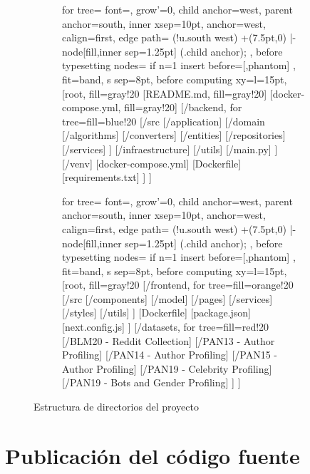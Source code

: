 \bigskip
\begin{figure}[H]
	\centering
	\begin{subfigure}[T]{0.5\textwidth}
		\begin{forest}
			for tree={
			font=\ttfamily\tiny,
			grow'=0,
			child anchor=west,
			parent anchor=south,
			inner xsep=10pt,
			anchor=west,
			calign=first,
			edge path={
					\noexpand{}
					(!u.south west) +(7.5pt,0) |- node[fill,inner sep=1.25pt] {} (.child anchor);
				},
			before typesetting nodes={
					if n=1
						{insert before={[,phantom]}}
						{}
				},
			fit=band,
			s sep=8pt,
			before computing xy={l=15pt},
			}
			[root, fill=gray!20
			[README.md, fill=gray!20]
			[docker-compose.yml, fill=gray!20]
			[/backend, for tree={fill=blue!20}
			[/src
			[/application]
			[/domain
			[/algorithms]
			[/converters]
			[/entities]
			[/repositories]
			[/services]
			]
			[/infraestructure]
			[/utils]
			[/main.py]
			]
			[/venv]
			[docker-compose.yml]
			[Dockerfile]
			[requirements.txt]
			]
			]
		\end{forest}
	\end{subfigure}%
	\begin{subfigure}[T]{0.5\textwidth}
		\begin{forest}
			for tree={
			font=\ttfamily\tiny,
			grow'=0,
			child anchor=west,
			parent anchor=south,
			inner xsep=10pt,
			anchor=west,
			calign=first,
			edge path={
					\noexpand{}
					(!u.south west) +(7.5pt,0) |- node[fill,inner sep=1.25pt] {} (.child anchor)\forestoption{edge label};
				},
			before typesetting nodes={
					if n=1
						{insert before={[,phantom]}}
						{}
				},
			fit=band,
			s sep=8pt,
			before computing xy={l=15pt},
			}
			[root, fill=gray!20
			[/frontend, for tree={fill=orange!20}
			[/src
			[/components]
			[/model]
			[/pages]
			[/services]
			[/styles]
			[/utils]
			]
			[Dockerfile]
			[package.json]
			[next.config.js]
			]
			[/datasets, for tree={fill=red!20}
				[/BLM20 - Reddit Collection]
				[/PAN13 - Author Profiling]
				[/PAN14 - Author Profiling]
				[/PAN15 - Author Profiling]
				[/PAN19 - Celebrity Profiling]
				[/PAN19 - Bots and Gender Profiling]
			]
			]
		\end{forest}
	\end{subfigure}
	\caption{Estructura de directorios del proyecto}
	\label{fig:estructura_proyecto}
\end{figure}

\section{Publicación del código fuente}
\label{sec:codigo_abierto}

